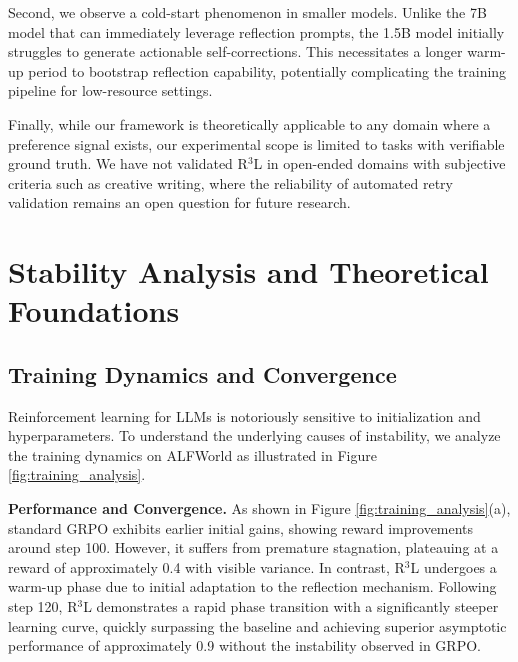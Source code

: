 \documentclass[11pt]{article}
\theoremstyle{definition}
\theoremstyle{remark}
\begin{document}
Second, we observe a cold-start phenomenon in smaller models. Unlike the 7B model that can immediately leverage reflection prompts, the 1.5B model initially struggles to generate actionable self-corrections. This necessitates a longer warm-up period to bootstrap reflection capability, potentially complicating the training pipeline for low-resource settings.

Finally, while our framework is theoretically applicable to any domain where a preference signal exists, our experimental scope is limited to tasks with verifiable ground truth. We have not validated R$^3$L in open-ended domains with subjective criteria such as creative writing, where the reliability of automated retry validation remains an open question for future research.



\appendix

\section{Stability Analysis and Theoretical Foundations}
\label{sec:stability}


\subsection{Training Dynamics and Convergence}
\label{sec:training_dynamics}
Reinforcement learning for LLMs is notoriously sensitive to initialization and hyperparameters. To understand the underlying causes of instability, we analyze the training dynamics on ALFWorld as illustrated in Figure \ref{fig:training_analysis}.

\textbf{Performance and Convergence.} As shown in Figure \ref{fig:training_analysis}(a), standard GRPO exhibits earlier initial gains, showing reward improvements around step 100. However, it suffers from premature stagnation, plateauing at a reward of approximately 0.4 with visible variance. In contrast, R$^3$L undergoes a warm-up phase due to initial adaptation to the reflection mechanism. Following step 120, R$^3$L demonstrates a rapid phase transition with a significantly steeper learning curve, quickly surpassing the baseline and achieving superior asymptotic performance of approximately 0.9 without the instability observed in GRPO.
\end{document}
